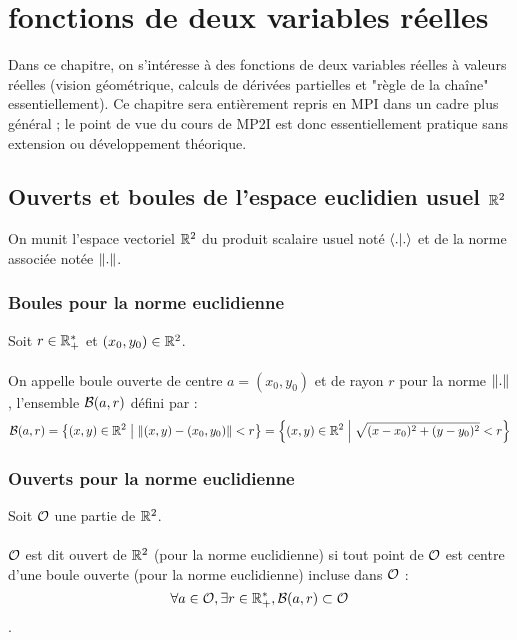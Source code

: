 \chapter{fonctions de deux variables réelles}
\minitoc 
Dans ce chapitre, on s’intéresse à des fonctions de deux variables réelles à valeurs réelles (vision géométrique, calculs de dérivées partielles et "règle de la chaîne" essentiellement). Ce chapitre sera entièrement repris en MPI dans un cadre plus général ; le point de vue du cours de MP2I est donc essentiellement pratique sans extension ou développement théorique.
\section{Ouverts et boules de l’espace euclidien usuel \(\R^2\)}
On munit l’espace vectoriel \(\R^2\) du produit scalaire usuel noté \(\scal{.}{.}\) et de la norme associée notée \(\norme{.}\).
\subsection{Boules pour la norme euclidienne}
\begin{defprop}
    Soit \(r \in \Rps\) et \((x_0, y_0) \in \R^2\).\\~\\
    On appelle boule ouverte de centre \(a = (x_0, y_0)\) et de rayon \(r\) pour la norme \(\norme{.}\), l’ensemble \(\cal{B}(a, r)\) défini par :
    \[\cal{B}(a, r) = \accol{(x, y) \in \R^2 \tq \norme{(x, y) - (x_0, y_0)} < r} = \accol{(x, y) \in \R^2 \tq \sqrt{(x - x_0)^2 + (y - y_0)^2} < r}\]
\end{defprop}
\subsection{Ouverts pour la norme euclidienne}
\begin{defprop}
    Soit \(\cal{O}\) une partie de \(\R^2\).\\~\\
    \(\cal{O}\) est dit ouvert de \(\R^2\) (pour la norme euclidienne) si tout point de \(\cal{O}\) est centre d’une boule ouverte (pour la norme euclidienne) incluse dans \(\cal{O}\) :
    \[\forall a \in \cal{O}, \exists r \in \Rps, \cal{B}(a, r) \subset \cal{O}\].
\end{defprop}
